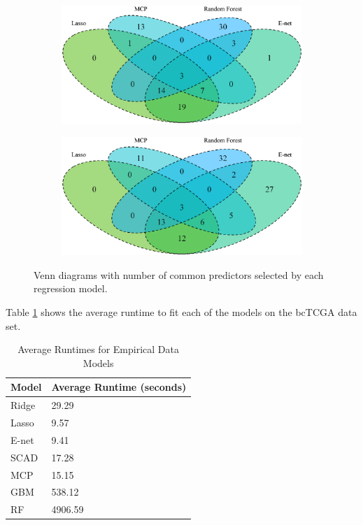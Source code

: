 \documentclass{article}
\begin{document}
\begin{figure}
\begin{subfigure}[b]{0.45\textwidth}
		\label{fig:venn3}
	\end{subfigure}
	\begin{subfigure}[b]{0.45\textwidth}
		\includegraphics[width=\textwidth]{images/venn/venn4.eps}
		\label{fig:venn4}
	\end{subfigure}
	\hspace{30pt}
	\begin{subfigure}[b]{0.45\textwidth}
		\includegraphics[width=\textwidth]{images/venn/venn5.eps}
		\label{fig:venn5}
	\end{subfigure}
	\captionsetup{width = 5in}
	\caption{Venn diagrams with number of common predictors selected by each regression model.}
	\label{fig:venn}
\end{figure}

Table \ref{tab:emp_runtimes} shows the average runtime to fit each of the models on the bcTCGA data set.

\begin{table}[]
	\centering
	\caption{Average Runtimes for Empirical Data Models}
	\label{tab:emp_runtimes}
	\begin{tabular}{ll}
		\hline
		\textbf{Model}        & \textbf{Average Runtime} (seconds) \\ \hline
		Ridge         & 29.29               \\
		Lasso         & 9.57                \\
		E-net	      & 9.41                \\
		SCAD          & 17.28               \\
		MCP           & 15.15               \\
		GBM      	  & 538.12              \\
		RF 			  & 4906.59             \\ \hline
	\end{tabular}
\end{table}
\end{document}
